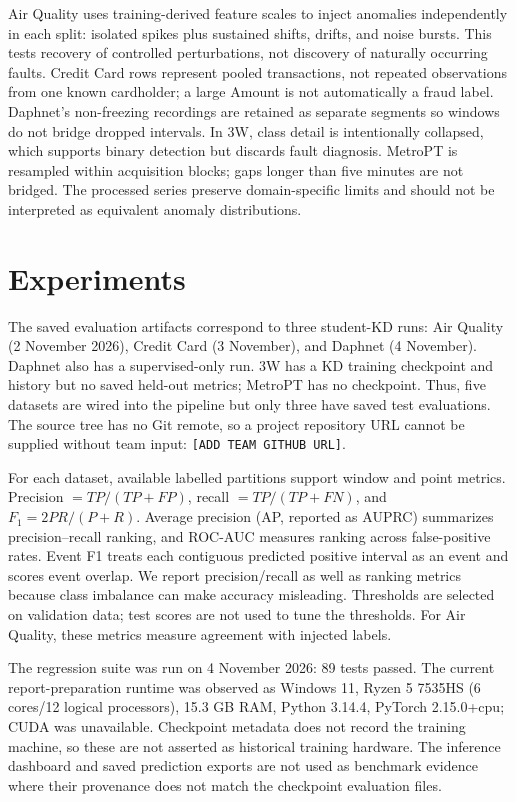 \documentclass[twoside,english]{article}
\begin{document}
Air Quality uses training-derived feature scales to inject anomalies independently in each split: isolated spikes plus sustained shifts, drifts, and noise bursts. This tests recovery of controlled perturbations, not discovery of naturally occurring faults. Credit Card rows represent pooled transactions, not repeated observations from one known cardholder; a large Amount is not automatically a fraud label. Daphnet's non-freezing recordings are retained as separate segments so windows do not bridge dropped intervals. In 3W, class detail is intentionally collapsed, which supports binary detection but discards fault diagnosis. MetroPT is resampled within acquisition blocks; gaps longer than five minutes are not bridged. The processed series preserve domain-specific limits and should not be interpreted as equivalent anomaly distributions.

\section{Experiments} \label{sec:exp}
The saved evaluation artifacts correspond to three student-KD runs: Air Quality (2 November 2026), Credit Card (3 November), and Daphnet (4 November). Daphnet also has a supervised-only run. 3W has a KD training checkpoint and history but no saved held-out metrics; MetroPT has no checkpoint. Thus, five datasets are wired into the pipeline but only three have saved test evaluations. The source tree has no Git remote, so a project repository URL cannot be supplied without team input: \texttt{[ADD TEAM GITHUB URL]}.

For each dataset, available labelled partitions support window and point metrics. Precision $=TP/(TP+FP)$, recall $=TP/(TP+FN)$, and $F_1=2PR/(P+R)$. Average precision (AP, reported as AUPRC) summarizes precision--recall ranking, and ROC-AUC measures ranking across false-positive rates. Event F1 treats each contiguous predicted positive interval as an event and scores event overlap. We report precision/recall as well as ranking metrics because class imbalance can make accuracy misleading. Thresholds are selected on validation data; test scores are not used to tune the thresholds. For Air Quality, these metrics measure agreement with injected labels.

The regression suite was run on 4 November 2026: 89 tests passed. The current report-preparation runtime was observed as Windows 11, Ryzen 5 7535HS (6 cores/12 logical processors), 15.3 GB RAM, Python 3.14.4, PyTorch 2.15.0+cpu; CUDA was unavailable. Checkpoint metadata does not record the training machine, so these are not asserted as historical training hardware. The inference dashboard and saved prediction exports are not used as benchmark evidence where their provenance does not match the checkpoint evaluation files.
\end{document}
